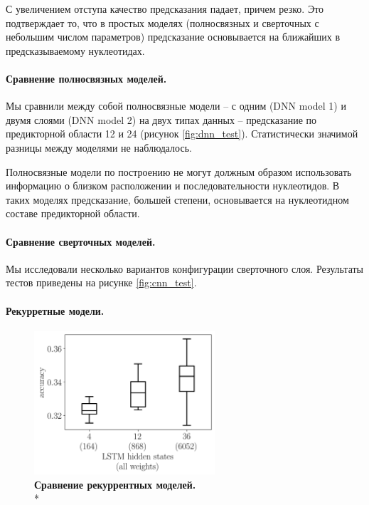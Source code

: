 С увеличением отступа качество предсказания падает, причем резко. Это подтверждает то, что в простых моделях (полносвязных и сверточных с небольшим числом параметров) предсказание основывается на ближайших в предсказываемому нуклеотидах.


 
 \paragraph{Сравнение полносвязных моделей.} Мы сравнили между собой полносвязные модели -- с одним (DNN model 1) и двумя слоями (DNN model 2)  на двух типах данных -- предсказание по предикторной области 12 и 24 (рисунок \ref{fig:dnn_test}). Статистически значимой разницы между моделями не наблюдалось.
 
 Полносвязные модели по построению не могут должным образом использовать информацию о близком расположении и последовательности нуклеотидов. В таких моделях предсказание, большей степени, основывается на нуклеотидном составе предикторной области.
 



\paragraph{Сравнение сверточных моделей.} Мы исследовали несколько вариантов конфигурации сверточного слоя. Результаты тестов приведены на рисунке \ref{fig:cnn_test}.



\paragraph{Рекурретные модели.}
\begin{figure}[h] %
	\centering
	\includegraphics[width = 0.6\textwidth]{pics/rnn_models_all_runs_p1_ecoli_100000_10000_50_0.png}
	\caption{{\bfseries Сравнение рекуррентных моделей.} \\* 
		   \mannwhitni }
	\label{fig:rnn_test}	
\end{figure}

	